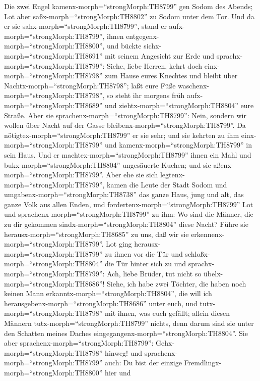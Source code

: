  Die zwei Engel kamenx-morph=``strongMorph:TH8799'' gen
Sodom des Abends; Lot aber saßx-morph=``strongMorph:TH8802'' zu Sodom
unter dem Tor. Und da er sie sahx-morph=``strongMorph:TH8799'', stand er
aufx-morph=``strongMorph:TH8799'', ihnen
entgegenx-morph=``strongMorph:TH8800'', und bückte
sichx-morph=``strongMorph:TH8691'' mit seinem Angesicht zur Erde
 und sprachx-morph=``strongMorph:TH8799'': Siehe, liebe
Herren, kehrt doch einx-morph=``strongMorph:TH8798'' zum Hause eures
Knechtes und bleibt über Nachtx-morph=``strongMorph:TH8798''; laßt eure
Füße waschenx-morph=``strongMorph:TH8798'', so steht ihr morgens früh
aufx-morph=``strongMorph:TH8689'' und
ziehtx-morph=``strongMorph:TH8804'' eure Straße. Aber sie
sprachenx-morph=``strongMorph:TH8799'': Nein, sondern wir wollen über
Nacht auf der Gasse bleibenx-morph=``strongMorph:TH8799''. 
Da nötigtex-morph=``strongMorph:TH8799'' er sie sehr; und sie kehrten zu
ihm einx-morph=``strongMorph:TH8799'' und
kamenx-morph=``strongMorph:TH8799'' in sein Haus. Und er
machtex-morph=``strongMorph:TH8799'' ihnen ein Mahl und
bukx-morph=``strongMorph:TH8804'' ungesäuerte Kuchen; und sie
aßenx-morph=``strongMorph:TH8799''.  Aber ehe sie sich
legtenx-morph=``strongMorph:TH8799'', kamen die Leute der Stadt Sodom
und umgabenx-morph=``strongMorph:TH8738'' das ganze Haus, jung und alt,
das ganze Volk aus allen Enden,  und
fordertenx-morph=``strongMorph:TH8799'' Lot und
sprachenx-morph=``strongMorph:TH8799'' zu ihm: Wo sind die Männer, die
zu dir gekommen sindx-morph=``strongMorph:TH8804'' diese Nacht? Führe
sie herausx-morph=``strongMorph:TH8685'' zu uns, daß wir sie
erkennenx-morph=``strongMorph:TH8799''.  Lot ging
herausx-morph=``strongMorph:TH8799'' zu ihnen vor die Tür und
schloßx-morph=``strongMorph:TH8804'' die Tür hinter sich zu 
und sprachx-morph=``strongMorph:TH8799'': Ach, liebe Brüder, tut nicht
so übelx-morph=``strongMorph:TH8686''!  Siehe, ich habe zwei
Töchter, die haben noch keinen Mann
erkanntx-morph=``strongMorph:TH8804'', die will ich
herausgebenx-morph=``strongMorph:TH8686'' unter euch, und
tutx-morph=``strongMorph:TH8798'' mit ihnen, was euch gefällt; allein
diesen Männern tutx-morph=``strongMorph:TH8799'' nichts, denn darum sind
sie unter den Schatten meines Daches
eingegangenx-morph=``strongMorph:TH8804''.  Sie aber
sprachenx-morph=``strongMorph:TH8799'':
Gehx-morph=``strongMorph:TH8798'' hinweg! und
sprachenx-morph=``strongMorph:TH8799'' auch: Du bist der einzige
Fremdlingx-morph=``strongMorph:TH8800'' hier und
